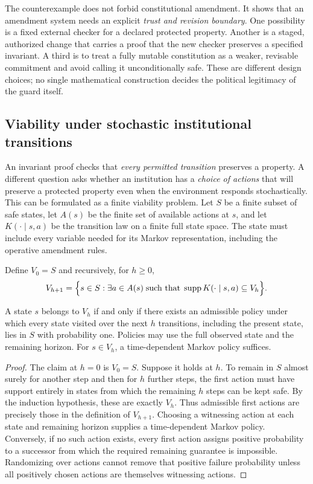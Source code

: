 The counterexample does not forbid constitutional amendment. It shows that an amendment system needs an explicit \emph{trust and revision boundary}. One possibility is a fixed external checker for a declared protected property. Another is a staged, authorized change that carries a proof that the new checker preserves a specified invariant. A third is to treat a fully mutable constitution as a weaker, revisable commitment and avoid calling it unconditionally safe. These are different design choices; no single mathematical construction decides the political legitimacy of the guard itself.

\subsection{Viability under stochastic institutional transitions}

An invariant proof checks that \emph{every permitted transition} preserves a property. A different question asks whether an institution has a \emph{choice of actions} that will preserve a protected property even when the environment responds stochastically. This can be formulated as a finite viability problem. Let $S$ be a finite subset of safe states, let $A(s)$ be the finite set of available actions at $s$, and let $K(\cdot\mid s,a)$ be the transition law on a finite full state space. The state must include every variable needed for its Markov representation, including the operative amendment rules.

Define $V_0=S$ and recursively, for $h\ge0$,
\begin{equation}\label{MS:eq:viability}
V_{h+1}=\Bigl\{s\in S:\exists a\in A(s)\;\text{such that}\;
\operatorname{supp}K(\cdot\mid s,a)\subseteq V_h\Bigr\}.
\end{equation}
\begin{MSproposition}\label{MS:prop:viability}
A state $s$ belongs to $V_h$ if and only if there exists an admissible policy under which every state visited over the next $h$ transitions, including the present state, lies in $S$ with probability one. Policies may use the full observed state and the remaining horizon. For $s\in V_h$, a time-dependent Markov policy suffices.
\end{MSproposition}
\begin{proof}
The claim at $h=0$ is $V_0=S$. Suppose it holds at $h$. To remain in $S$ almost surely for another step and then for $h$ further steps, the first action must have support entirely in states from which the remaining $h$ steps can be kept safe. By the induction hypothesis, these are exactly $V_h$. Thus admissible first actions are precisely those in the definition of $V_{h+1}$. Choosing a witnessing action at each state and remaining horizon supplies a time-dependent Markov policy. Conversely, if no such action exists, every first action assigns positive probability to a successor from which the required remaining guarantee is impossible. Randomizing over actions cannot remove that positive failure probability unless all positively chosen actions are themselves witnessing actions.
\end{proof}

